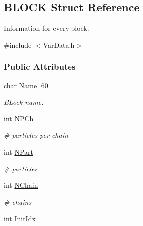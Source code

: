 \hypertarget{structBLOCK}{\subsection{\-B\-L\-O\-C\-K \-Struct \-Reference}
\label{structBLOCK}
}


\-Information for every block.  




{\ttfamily \#include $<$\-Var\-Data.\-h$>$}

\subsubsection*{\-Public \-Attributes}
\begin{DoxyCompactItemize}
\item 
\hypertarget{structBLOCK_a7b413349ba4d10cbeb9b09be7c471c9e}{char \hyperlink{structBLOCK_a7b413349ba4d10cbeb9b09be7c471c9e}{\-Name} \mbox{[}60\mbox{]}}\label{structBLOCK_a7b413349ba4d10cbeb9b09be7c471c9e}

\begin{DoxyCompactList}\small\item\em \-B\-Lock name. \end{DoxyCompactList}\item 
\hypertarget{structBLOCK_a521663d12899e0fefe0a182332a8573f}{int \hyperlink{structBLOCK_a521663d12899e0fefe0a182332a8573f}{\-N\-P\-Ch}}\label{structBLOCK_a521663d12899e0fefe0a182332a8573f}

\begin{DoxyCompactList}\small\item\em \# particles per chain \end{DoxyCompactList}\item 
\hypertarget{structBLOCK_abdcc792391d8c5092471dff191de47f4}{int \hyperlink{structBLOCK_abdcc792391d8c5092471dff191de47f4}{\-N\-Part}}\label{structBLOCK_abdcc792391d8c5092471dff191de47f4}

\begin{DoxyCompactList}\small\item\em \# particles \end{DoxyCompactList}\item 
\hypertarget{structBLOCK_aa49e4d7af0d71e79524ef6fb081707b5}{int \hyperlink{structBLOCK_aa49e4d7af0d71e79524ef6fb081707b5}{\-N\-Chain}}\label{structBLOCK_aa49e4d7af0d71e79524ef6fb081707b5}

\begin{DoxyCompactList}\small\item\em \# chains \end{DoxyCompactList}\item 
\hypertarget{structBLOCK_a71d10413e52e4e5aa82ac5e6189afdd0}{int \hyperlink{structBLOCK_a71d10413e52e4e5aa82ac5e6189afdd0}{\-Init\-Idx}}\label{structBLOCK_a71d10413e52e4e5aa82ac5e6189afdd0}


\end{DoxyCompactItemize}
